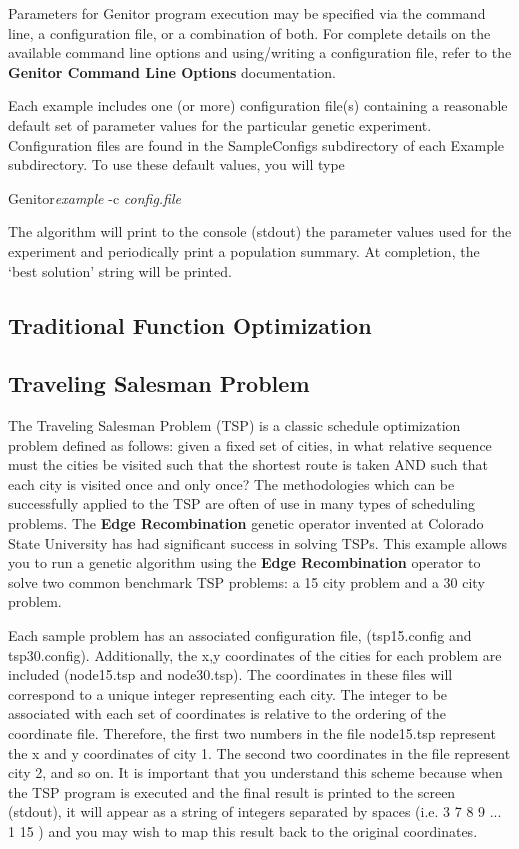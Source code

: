Parameters for Genitor program execution may be specified via the
command line, a configuration file, or a combination of both.  For
complete details on the available command line options and using/writing a
configuration file, refer to the {\bf Genitor Command Line Options}
documentation.

Each example includes one (or more) configuration file(s) containing
a reasonable default set of parameter values for the particular
genetic experiment.  Configuration files are found in the SampleConfigs
subdirectory of each Example subdirectory.  To use these default values,
you will type

Genitor{\it example} -c {\it config.file}

The algorithm will print to the console (stdout) the parameter values
used for the experiment and periodically print a population summary.
At completion, the `best solution' string will be printed.

\subsection{Traditional Function Optimization}
\subsection{Traveling Salesman Problem}

The Traveling Salesman Problem (TSP) is a classic schedule optimization
problem defined as follows:  given a fixed set of cities, in what relative
sequence must the cities be visited such that the shortest route is taken
AND such that each city is visited once and only once? The
methodologies which can be successfully applied to the TSP are often of use in
many types of scheduling problems.  The {\bf Edge Recombination} genetic
operator invented at Colorado State University has had significant success in
solving TSPs.  This example allows you to run a genetic algorithm using the
{\bf Edge Recombination} operator to solve two common benchmark TSP
problems: a 15 city problem and a 30 city problem.

Each sample problem has an associated configuration file, (tsp15.config and
tsp30.config).  Additionally, the x,y coordinates of the cities for each
problem are included (node15.tsp and node30.tsp).  The coordinates in these
files will correspond to a unique integer representing each city.  The integer
to be associated with each set of coordinates is relative to the ordering of
the coordinate file.  Therefore, the first two numbers in the file node15.tsp
represent the x and y coordinates of city 1.  The second two coordinates in
the file represent city 2, and so on.  It is important that you understand
this scheme because when the TSP program is executed and the final result is
printed to the screen (stdout), it will appear as a string of integers
separated by spaces (i.e. 3 7 8 9 ... 1 15 ) and you may wish to map this
result back to the original coordinates.

